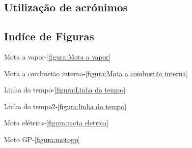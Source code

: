 \documentclass{report}
\begin{document}
\subsection{Utilização de acrónimos}
\label{sec.util}


\subsection{Indíce de Figuras}
Mota a vapor-\autoref{figura:Mota a vapor}

Mota a combustão interna-\autoref{figura:Mota a combustão interna}

Linha do tempo-\autoref{figura:Linha do tempo}

Linha do tempo2-\autoref{figura:linha do tempo}

Mota elétrica-\autoref{figura:mota eletrica}

Moto GP-\autoref{figura:motogp} 
\end{document}
